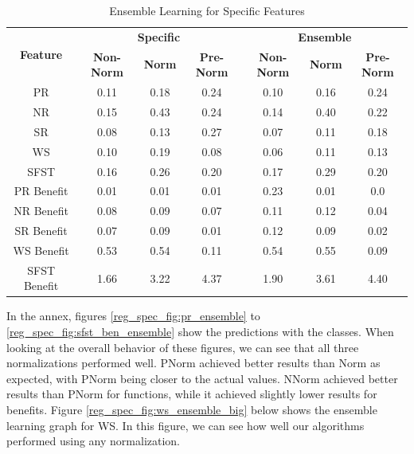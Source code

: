 \documentclass[12pt,letterpaper]{article}
\begin{document}
\begin{table}[H]
\centering
\begin{tabular}{|c||c|c|c||c|c|c|}
\hline
\multirow{2}{*}{\textbf{Feature}} & \multicolumn{3}{c||}{\textbf{Specific}} & \multicolumn{3}{c|}{\textbf{Ensemble}} \\
\cline{2-7}
 & \textbf{Non-Norm} & \textbf{Norm} & \textbf{Pre-Norm} & \textbf{Non-Norm} & \textbf{Norm} & \textbf{Pre-Norm} \\
\hline
PR &  0.11 & 0.18 & 0.24 & 0.10 & 0.16 & 0.24 \\
\hline
NR &  0.15 & 0.43 & 0.24 & 0.14 & 0.40 & 0.22 \\
\hline
SR &  0.08 & 0.13 & 0.27 & 0.07 & 0.11 & 0.18 \\
\hline
WS & 0.10 & 0.19 & 0.08 & 0.06 & 0.11 & 0.13 \\
\hline
SFST &  0.16 & 0.26 & 0.20 & 0.17 & 0.29 & 0.20 \\
\hline
PR Benefit & 0.01 & 0.01 & 0.01 & 0.23 & 0.01 & 0.0 \\
\hline
NR Benefit &  0.08 & 0.09 & 0.07 & 0.11 & 0.12 & 0.04 \\
\hline
SR Benefit &  0.07 & 0.09 & 0.01 & 0.12 & 0.09 & 0.02 \\
\hline
WS Benefit &  0.53 & 0.54 & 0.11 & 0.54 & 0.55 & 0.09 \\
\hline
SFST Benefit & 1.66 & 3.22 & 4.37 & 1.90 & 3.61 & 4.40 \\
\hline
\end{tabular}
\caption{Ensemble Learning for Specific Features}
\label{reg_spec_tab:ensemble}
\end{table}

In the annex, figures \ref{reg_spec_fig:pr_ensemble} to \ref{reg_spec_fig:sfst_ben_ensemble} show the predictions with the classes.
When looking at the overall behavior of these figures, we can see that all three normalizations performed well.
\ac{PNorm} achieved better results than \ac{Norm} as expected, with \ac{PNorm} being closer to the actual values.
\ac{NNorm} achieved better results than \ac{PNorm} for functions, while it achieved slightly lower results for benefits.
Figure \ref{reg_spec_fig:ws_ensemble_big} below shows the ensemble learning graph for \ac{WS}.
In this figure, we can see how well our algorithms performed using any normalization.
\end{document}
